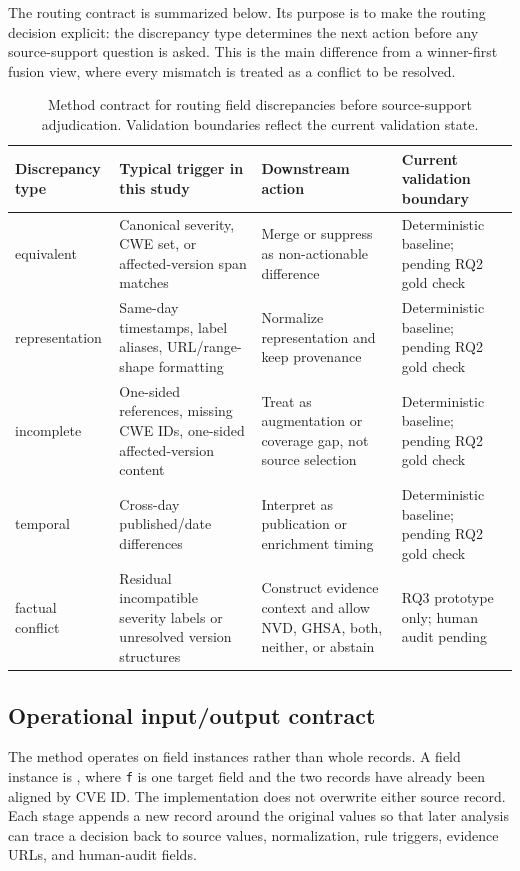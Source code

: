 The routing contract is summarized below. Its purpose is to make the routing decision explicit: the discrepancy type determines the next action before any source-support question is asked. This is the main difference from a winner-first fusion view, where every mismatch is treated as a conflict to be resolved.

\begin{table}[!htbp]
\centering
\setlength{\tabcolsep}{3pt}
\footnotesize
\caption{Method contract for routing field discrepancies before source-support adjudication. Validation boundaries reflect the current validation state.}
\label{tab:03-method-table-1}
\begin{tabularx}{\textwidth}{>{\raggedright\arraybackslash}p{}>{\raggedright\arraybackslash}X>{\raggedright\arraybackslash}X>{\raggedright\arraybackslash}X}
\toprule
Discrepancy type & Typical trigger in this study & Downstream action & Current validation boundary \\
\midrule
equivalent & Canonical severity, CWE set, or affected-version span matches & Merge or suppress as non-actionable difference & Deterministic baseline; pending RQ2 gold check \\
representation & Same-day timestamps, label aliases, URL/range-shape formatting & Normalize representation and keep provenance & Deterministic baseline; pending RQ2 gold check \\
incomplete & One-sided references, missing CWE IDs, one-sided affected-version content & Treat as augmentation or coverage gap, not source selection & Deterministic baseline; pending RQ2 gold check \\
temporal & Cross-day published/date differences & Interpret as publication or enrichment timing & Deterministic baseline; pending RQ2 gold check \\
factual conflict & Residual incompatible severity labels or unresolved version structures & Construct evidence context and allow NVD, GHSA, both, neither, or abstain & RQ3 prototype only; human audit pending \\
\bottomrule
\end{tabularx}
\end{table}

\subsection{Operational input/output contract}

The method operates on field instances rather than whole records. A field instance is , where \texttt{f} is one target field and the two records have already been aligned by CVE ID. The implementation does not overwrite either source record. Each stage appends a new record around the original values so that later analysis can trace a decision back to source values, normalization, rule triggers, evidence URLs, and human-audit fields.

